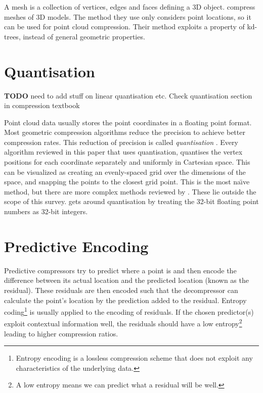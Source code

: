 \documentclass{report}
\newcommand{\todo}{\textbf{TODO} }
\begin{document}
A mesh is a collection of vertices, edges and faces defining a 3D
object. \citep{devillers2000gci} compress meshes of 3D models. The method they
use only considers point locations, so it can be used for point cloud
compression. Their method exploits a property of kd-trees, instead of general
geometric properties.


\section{Quantisation}

\todo need to add stuff on linear quantisation etc. Check quantisation section
in compression textbook

Point cloud data usually stores the point coordinates in a floating point
format. Most geometric compression algorithms reduce the precision to achieve
better compression rates. This reduction of precision is called
\emph{quantisation} \citep{ag-racm-03}. Every algorithm reviewed in this paper
that uses quantisation, quantises the vertex positions for each coordinate
separately and uniformly in Cartesian space. This can be visualized as
creating an evenly-spaced grid over the dimensions of the space, and snapping
the points to the closest grid point. This is the most na\"{\i}ve method, but
there are more complex methods reviewed by \citep{ag-racm-03}. These lie
outside the scope of this survey. \citep{chen2005lcp} gets around quantisation
by treating the 32-bit floating point numbers as 32-bit integers.


\section{Predictive Encoding}

Predictive compressors try to predict where a point is and then encode the
difference between its actual location and the predicted location (known as
the residual). These residuals are then encoded such that the decompressor can
calculate the point's location by the prediction added to the
residual. Entropy coding\footnote{Entropy encoding is a lossless compression
  scheme that does not exploit any characteristics of the underlying data.} is
usually applied to the encoding of residuals. If the chosen predictor(s)
exploit contextual information well, the residuals should have a low
entropy\footnote{A low entropy means we can predict what a residual will be
  well.}  leading to higher compression ratios.
\end{document}

